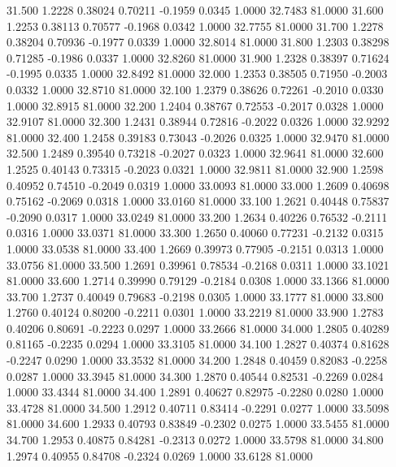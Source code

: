   31.500   1.2228   0.38024   0.70211  -0.1959   0.0345   1.0000  32.7483  81.0000
  31.600   1.2253   0.38113   0.70577  -0.1968   0.0342   1.0000  32.7755  81.0000
  31.700   1.2278   0.38204   0.70936  -0.1977   0.0339   1.0000  32.8014  81.0000
  31.800   1.2303   0.38298   0.71285  -0.1986   0.0337   1.0000  32.8260  81.0000
  31.900   1.2328   0.38397   0.71624  -0.1995   0.0335   1.0000  32.8492  81.0000
  32.000   1.2353   0.38505   0.71950  -0.2003   0.0332   1.0000  32.8710  81.0000
  32.100   1.2379   0.38626   0.72261  -0.2010   0.0330   1.0000  32.8915  81.0000
  32.200   1.2404   0.38767   0.72553  -0.2017   0.0328   1.0000  32.9107  81.0000
  32.300   1.2431   0.38944   0.72816  -0.2022   0.0326   1.0000  32.9292  81.0000
  32.400   1.2458   0.39183   0.73043  -0.2026   0.0325   1.0000  32.9470  81.0000
  32.500   1.2489   0.39540   0.73218  -0.2027   0.0323   1.0000  32.9641  81.0000
  32.600   1.2525   0.40143   0.73315  -0.2023   0.0321   1.0000  32.9811  81.0000
  32.900   1.2598   0.40952   0.74510  -0.2049   0.0319   1.0000  33.0093  81.0000
  33.000   1.2609   0.40698   0.75162  -0.2069   0.0318   1.0000  33.0160  81.0000
  33.100   1.2621   0.40448   0.75837  -0.2090   0.0317   1.0000  33.0249  81.0000
  33.200   1.2634   0.40226   0.76532  -0.2111   0.0316   1.0000  33.0371  81.0000
  33.300   1.2650   0.40060   0.77231  -0.2132   0.0315   1.0000  33.0538  81.0000
  33.400   1.2669   0.39973   0.77905  -0.2151   0.0313   1.0000  33.0756  81.0000
  33.500   1.2691   0.39961   0.78534  -0.2168   0.0311   1.0000  33.1021  81.0000
  33.600   1.2714   0.39990   0.79129  -0.2184   0.0308   1.0000  33.1366  81.0000
  33.700   1.2737   0.40049   0.79683  -0.2198   0.0305   1.0000  33.1777  81.0000
  33.800   1.2760   0.40124   0.80200  -0.2211   0.0301   1.0000  33.2219  81.0000
  33.900   1.2783   0.40206   0.80691  -0.2223   0.0297   1.0000  33.2666  81.0000
  34.000   1.2805   0.40289   0.81165  -0.2235   0.0294   1.0000  33.3105  81.0000
  34.100   1.2827   0.40374   0.81628  -0.2247   0.0290   1.0000  33.3532  81.0000
  34.200   1.2848   0.40459   0.82083  -0.2258   0.0287   1.0000  33.3945  81.0000
  34.300   1.2870   0.40544   0.82531  -0.2269   0.0284   1.0000  33.4344  81.0000
  34.400   1.2891   0.40627   0.82975  -0.2280   0.0280   1.0000  33.4728  81.0000
  34.500   1.2912   0.40711   0.83414  -0.2291   0.0277   1.0000  33.5098  81.0000
  34.600   1.2933   0.40793   0.83849  -0.2302   0.0275   1.0000  33.5455  81.0000
  34.700   1.2953   0.40875   0.84281  -0.2313   0.0272   1.0000  33.5798  81.0000
  34.800   1.2974   0.40955   0.84708  -0.2324   0.0269   1.0000  33.6128  81.0000
